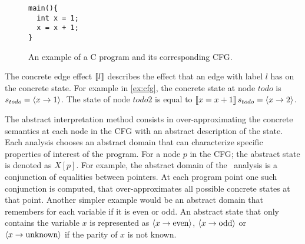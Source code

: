 \begin{figure}\begin{minipage}{0.45\textwidth}

\begin{verbatim}
main(){
  int x = 1;
  x = x + 1;
}
\end{verbatim}

\end{minipage}
\begin{minipage}{0.45\textwidth}

\end{minipage}

  \caption{An example of a C program and its corresponding CFG.}
\label{fig:example-C-program}

\end{figure}

The concrete edge effect $\llbracket l\rrbracket$ describes the effect that an edge with label $l$ has on the concrete state.
For example in \cref{ex:cfg}, the concrete state at node $todo$ is $s_{todo} = \langle x \rightarrow 1\rangle$.
The state of node $todo2$ is equal to $\llbracket x = x+1\rrbracket\,s_{todo} = \langle x \rightarrow 2\rangle$.

The abstract interpretation method consists in over-approximating the concrete semantics at each node in the CFG with an abstract description of the state.
Each analysis chooses an abstract domain that can characterize specific properties of interest of the program.
For a node $p$ in the CFG; the abstract state is denoted as $X[p]$.
For example, the abstract domain of the \cpo\ analysis is a conjunction of equalities between pointers.
At each program point one such conjunction is computed, that over-approximates all possible concrete states at that point.
Another simpler example would be an abstract domain that remembers for each variable if it is even or odd.
An abstract state that only contains the variable $x$ is represented as $\langle x \rightarrow \text{even}\rangle$, $\langle x \rightarrow \text{odd}\rangle$ or $\langle x \rightarrow \text{unknown}\rangle$ if the parity of $x$ is not known.

